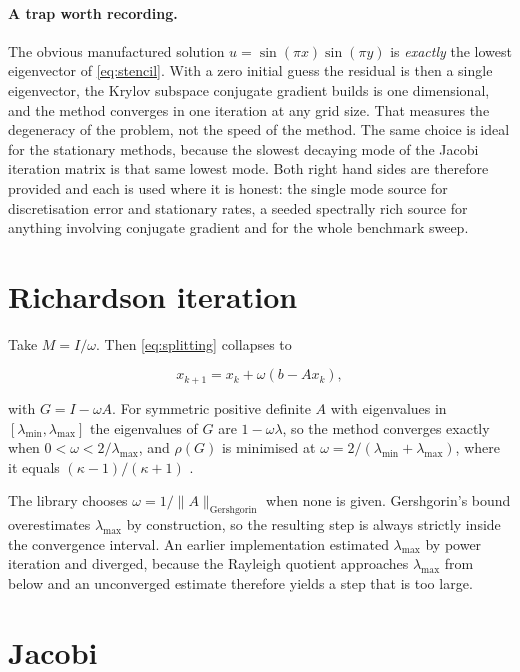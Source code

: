 \paragraph{A trap worth recording.} The obvious manufactured solution
$u = \sin(\pi x)\sin(\pi y)$ is \emph{exactly} the lowest eigenvector of
\eqref{eq:stencil}. With a zero initial guess the residual is then a single
eigenvector, the Krylov subspace conjugate gradient builds is one dimensional,
and the method converges in one iteration at any grid size. That measures the
degeneracy of the problem, not the speed of the method. The same choice is ideal
for the stationary methods, because the slowest decaying mode of the Jacobi
iteration matrix is that same lowest mode. Both right hand sides are therefore
provided and each is used where it is honest: the single mode source for
discretisation error and stationary rates, a seeded spectrally rich source for
anything involving conjugate gradient and for the whole benchmark sweep.

\section{Richardson iteration}

Take $M = I/\omega$. Then \eqref{eq:splitting} collapses to

\begin{equation}
  x_{k+1} = x_k + \omega\left(b - A x_k\right),
\end{equation}

with $G = I - \omega A$. For symmetric positive definite $A$ with eigenvalues in
$[\lambda_{\min}, \lambda_{\max}]$ the eigenvalues of $G$ are
$1 - \omega\lambda$, so the method converges exactly when
$0 < \omega < 2/\lambda_{\max}$, and $\rho(G)$ is minimised at
$\omega = 2/(\lambda_{\min} + \lambda_{\max})$, where it equals
$(\kappa - 1)/(\kappa + 1)$ \cite[Sec.~4.1]{saad2003}.

The library chooses $\omega = 1/\|A\|_{\text{Gershgorin}}$ when none is given.
Gershgorin's bound overestimates $\lambda_{\max}$ by construction, so the
resulting step is always strictly inside the convergence interval. An earlier
implementation estimated $\lambda_{\max}$ by power iteration and diverged,
because the Rayleigh quotient approaches $\lambda_{\max}$ from below and an
unconverged estimate therefore yields a step that is too large.

\section{Jacobi}

